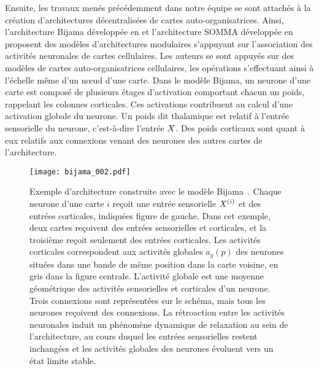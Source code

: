 \documentclass[../main]{subfiles}
\begin{document}
Ensuite, les travaux menés précédemment dans notre équipe se sont attachés à la création d'architectures décentralisées de cartes auto-organisatrices.
Ainsi, l'architecture Bijama développée en \cite{menard05} et l'architecture SOMMA développée en \cite{lefort_unlearning_2011} proposent des modèles d'architectures modulaires s'appuyant sur l'association des activités neuronales de cartes cellulaires.
Les auteurs se sont appuyés sur des modèles de cartes auto-organisatrices cellulaires, les opérations s'effectuant ainsi à l'échelle même d'un n\oe{}ud d'une carte.
Dans le modèle Bijama, un neurone d'une carte est composé de plusieurs étages d'activation comportant chacun un poids, rappelant les colonnes corticales. Ces activations contribuent au calcul d'une activation globale du neurone.
Un poids dit thalamique est relatif à l'entrée sensorielle du neurone, c'est-à-dire l'entrée $X$.
Des poids corticaux sont quant à eux relatifs aux connexions venant des neurones des autres cartes de l'architecture.

\begin{figure}
    \centering
    \texttt{[image: bijama\_002.pdf]}
    \caption{Exemple d'architecture construite avec le modèle Bijama~\parencite{menard05}.
    Chaque neurone d'une carte $i$ reçoit une entrée sensorielle $X^{({i})}$ et des entrées corticales, indiquées figure de gauche.
    Dans cet exemple, deux cartes reçoivent des entrées sensorielles et corticales, et la troisième reçoit seulement des entrées corticales.
    Les activités corticales correspondent aux activités globales $a_g(p)$ des neurones situées dans une bande de même position dans la carte voisine, en gris dans la figure centrale. L'activité globale est une moyenne géométrique des activités sensorielles et corticales d'un neurone.
    Trois connexions sont représentées sur le schéma, mais tous les neurones reçoivent des connexions.
    La rétroaction entre les activités neuronales induit un phénomène dynamique de relaxation au sein de l'architecture, au cours duquel les entrées sensorielles restent inchangées et les activités globales des neurones évoluent vers un état limite stable. \label{fig:bijama}}
\end{figure}
\end{document}
